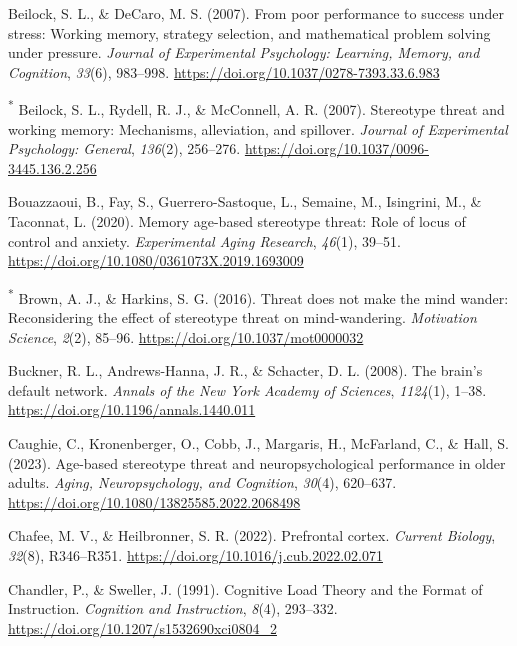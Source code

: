 \documentclass[
  stu, a4paper, 12pt,mask,floatsintext]{apa7}
\newlength{\cslhangindent}
\newenvironment{CSLReferences}[2] %
 {\begin{list}{}{%
  \setlength{\itemindent}{0pt}
  \setlength{\leftmargin}{0pt}
  \setlength{\parsep}{0pt}
  \ifodd #1
   \setlength{\leftmargin}{\cslhangindent}
   \setlength{\itemindent}{-1\cslhangindent}
  \fi
  \setlength{\itemsep}{#2\baselineskip}}}
 {\end{list}}
\begin{document}
\begin{CSLReferences}{1}{0}
Beilock, S. L., \& DeCaro, M. S. (2007). From poor performance to success under stress: {Working} memory, strategy selection, and mathematical problem solving under pressure. \emph{Journal of Experimental Psychology: Learning, Memory, and Cognition}, \emph{33}(6), 983--998. \url{https://doi.org/10.1037/0278-7393.33.6.983}

\textsuperscript{*} Beilock, S. L., Rydell, R. J., \& McConnell, A. R. (2007). Stereotype threat and working memory: {Mechanisms}, alleviation, and spillover. \emph{Journal of Experimental Psychology: General}, \emph{136}(2), 256--276. \url{https://doi.org/10.1037/0096-3445.136.2.256}

Bouazzaoui, B., Fay, S., Guerrero-Sastoque, L., Semaine, M., Isingrini, M., \& Taconnat, L. (2020). Memory age-based stereotype threat: {Role} of locus of control and anxiety. \emph{Experimental Aging Research}, \emph{46}(1), 39--51. \url{https://doi.org/10.1080/0361073X.2019.1693009}

\textsuperscript{*} Brown, A. J., \& Harkins, S. G. (2016). Threat does not make the mind wander: {Reconsidering} the effect of stereotype threat on mind-wandering. \emph{Motivation Science}, \emph{2}(2), 85--96. \url{https://doi.org/10.1037/mot0000032}

Buckner, R. L., Andrews-Hanna, J. R., \& Schacter, D. L. (2008). The brain's default network. \emph{Annals of the New York Academy of Sciences}, \emph{1124}(1), 1--38. \url{https://doi.org/10.1196/annals.1440.011}

Caughie, C., Kronenberger, O., Cobb, J., Margaris, H., McFarland, C., \& Hall, S. (2023). Age-based stereotype threat and neuropsychological performance in older adults. \emph{Aging, Neuropsychology, and Cognition}, \emph{30}(4), 620--637. \url{https://doi.org/10.1080/13825585.2022.2068498}

Chafee, M. V., \& Heilbronner, S. R. (2022). Prefrontal cortex. \emph{Current Biology}, \emph{32}(8), R346--R351. \url{https://doi.org/10.1016/j.cub.2022.02.071}

Chandler, P., \& Sweller, J. (1991). Cognitive {Load Theory} and the {Format} of {Instruction}. \emph{Cognition and Instruction}, \emph{8}(4), 293--332. \url{https://doi.org/10.1207/s1532690xci0804_2}


\end{CSLReferences}
\end{document}
